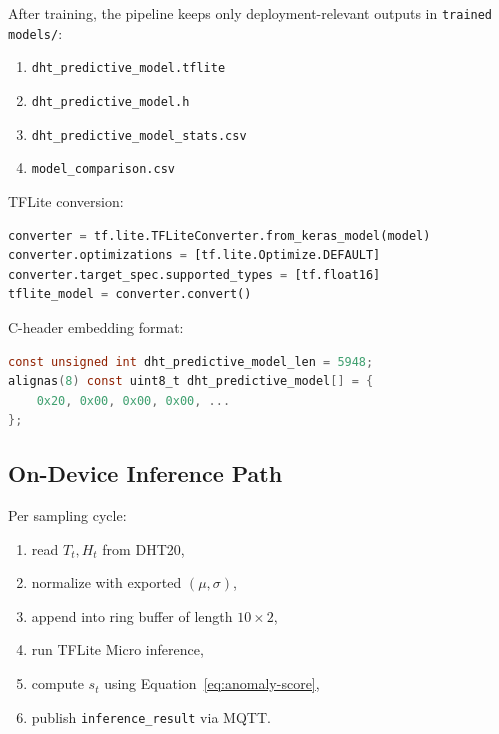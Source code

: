After training, the pipeline keeps only deployment-relevant outputs in
\texttt{trained models/}:
\begin{enumerate}
    \item \texttt{dht\_predictive\_model.tflite}
    \item \texttt{dht\_predictive\_model.h}
    \item \texttt{dht\_predictive\_model\_stats.csv}
    \item \texttt{model\_comparison.csv}
\end{enumerate}

TFLite conversion:
\begin{lstlisting}[style=espCode, language=Python,
    caption={Final TFLite conversion path used in the training script.},
    label={lst:tflite-convert}]
converter = tf.lite.TFLiteConverter.from_keras_model(model)
converter.optimizations = [tf.lite.Optimize.DEFAULT]
converter.target_spec.supported_types = [tf.float16]
tflite_model = converter.convert()
\end{lstlisting}

C-header embedding format:
\begin{lstlisting}[style=espCode, language=C,
    caption={Generated C header layout for firmware embedding.},
    label={lst:c-header}]
const unsigned int dht_predictive_model_len = 5948;
alignas(8) const uint8_t dht_predictive_model[] = {
    0x20, 0x00, 0x00, 0x00, ...
};
\end{lstlisting}

\subsection{On-Device Inference Path}
\label{sec:tinyml-firmware}

Per sampling cycle:
\begin{enumerate}
    \item read $T_t, H_t$ from DHT20,
    \item normalize with exported $(\mu,\sigma)$,
    \item append into ring buffer of length $10 \times 2$,
    \item run TFLite Micro inference,
    \item compute $s_t$ using Equation~\ref{eq:anomaly-score},
    \item publish \texttt{inference\_result} via MQTT.
\end{enumerate}

